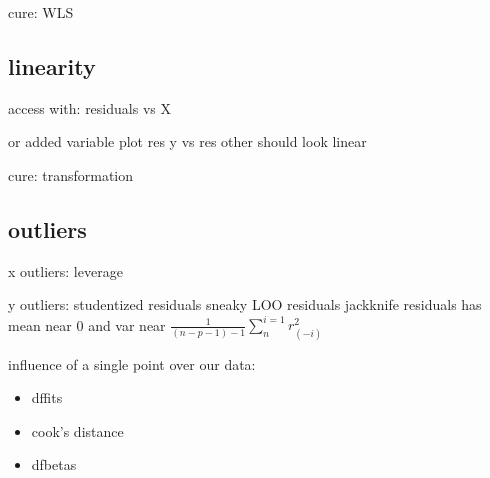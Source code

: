 \documentclass[10pt]{article}
\newcommand{\su}[2]{\sum_{#1}^{#2}}
\theoremstyle{break}
\begin{document}
            cure: WLS

            \subsection{linearity }
            access with: residuals vs X 

            or added variable plot      res y vs res other should look linear 

            cure: transformation 
            
            \subsection{outliers}
            x outliers: leverage 

            y outliers: studentized residuals sneaky LOO residuals 
            jackknife residuals has mean near 0 and var near $\frac{1}{(n-p-1)-1}\su{n}{i=1}r^2_{(-i)}$


            influence of a single point over our data:
            \begin{itemize}
                \item dffits 
                \item cook's distance 
                \item dfbetas
            \end{itemize}
        

        
\end{document}
